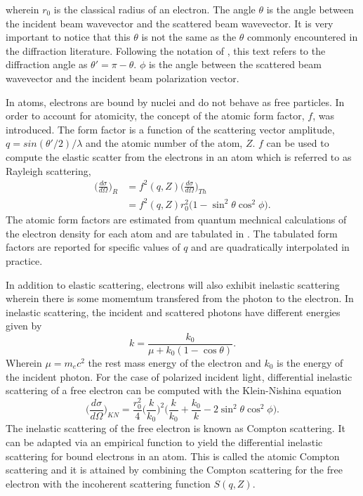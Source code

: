 \documentclass{report}
\begin{document}
wherein $r_0$ is the classical radius of an electron. 
The angle $\theta$ is the angle between the incident beam wavevector and the scattered beam wavevector. 
It is very important to notice that this $\theta$ is not the same as the $\theta$ commonly encountered in the diffraction literature.
Following the notation of \cite{Hanson1986-ta}, this text refers to the diffraction angle as $\theta'=\pi - \theta$.
$\phi$ is the angle between the scattered beam wavevector and the incident beam polarization vector. 


In atoms, electrons are bound by nuclei and do not behave as free particles. 
In order to account for atomicity, the concept of the atomic form factor, $f$, was introduced. 
The form factor is a function of the scattering vector amplitude, $q = sin(\theta'/2)/\lambda$ and the atomic number of the atom, $Z$. 
$f$ can be used to compute the elastic scatter from the electrons in an atom which is referred to as Rayleigh scattering, 
\begin{equation}
\begin{aligned}
\label{formfactor}
\bigg( \frac {d\sigma}{d\Omega} \bigg)_R &= f^2(q, Z) \bigg( \frac {d\sigma}{d\Omega} \bigg)_{Th} \\
                                         &= f^2(q, Z)  r_0^2 \bigg(1 - \sin^2 \theta \cos^2 \phi \bigg).
\end{aligned}
\end{equation}
The atomic form factors are estimated from quantum mechnical calculations of the electron density for each atom and are tabulated in \cite{Hubbell1975-fl}. The tabulated form factors are reported for specific values of $q$ and are quadratically interpolated in practice.

In addition to elastic scattering, electrons will also exhibit inelastic scattering wherein there is some momemtum transfered from the photon to the electron. 
In inelastic scattering, the incident and scattered photons have different energies given by \cite{Heitler1954-vq}
\begin{equation}
k = \frac {k_0} {\mu + k_0(1 - \cos \theta)}. 
\end{equation}
Wherein $\mu = m_ec^2$ the rest mass energy of the electron and $k_0$ is the energy of the incident photon. 
For the case of polarized incident light, differential inelastic scattering of a free electron can be computed with the Klein-Nishina equation \cite{Klein1929-ic}
\begin{equation}
\label{compton}
\bigg( \frac {d\sigma}{d\Omega} \bigg)_{KN} = \frac {r_0^2} {4} \bigg(\frac{k}{k_0}\bigg)^2\bigg(\frac {k} {k_0} + \frac {k_0} {k} - 2 \sin^2 \theta \cos^2 \phi \bigg).
\end{equation}
The inelastic scattering of the free electron is known as Compton scattering. 
It can be adapted via an empirical function to yield the differential inelastic scattering for bound electrons in an atom.
This is called the atomic Compton scattering and it is attained by combining the Compton scattering for the free electron with the incoherent scattering function $S(q, Z)$.
\end{document}

